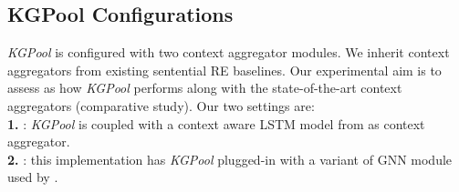\documentclass[11pt,a4paper]{article}
\begin{document}
\subsection{KGPool Configurations} \label{sec:config}
\textit{KGPool} is configured with two context aggregator modules. 
We inherit context aggregators from existing sentential RE baselines. 
Our experimental aim is to assess as how \textit{KGPool} performs along with the state-of-the-art context aggregators (comparative study). Our two settings are:\\
\textbf{1.} \textbf{}: \textit{KGPool} is coupled with a context aware LSTM model from \cite{DBLP:conf/emnlp/SorokinG17} as context aggregator.  \\
\textbf{2.} \textbf{}: this implementation has \textit{KGPool} plugged-in with a variant of GNN module used by \cite{DBLP:conf/acl/ZhuLLFCS19,bastos2020recon}.\\
\end{document}
